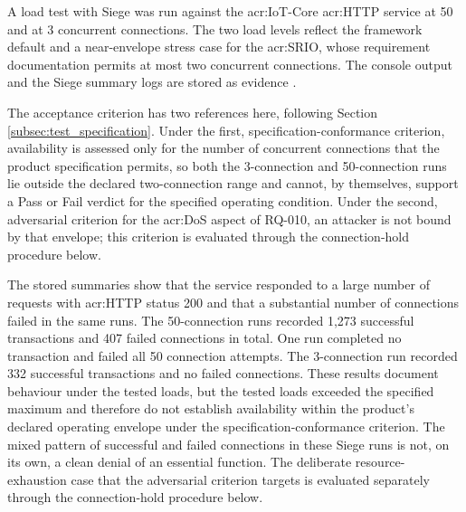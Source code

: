 A load test with Siege was run against the \gls{acr:IoT}-Core \gls{acr:HTTP} service at 50 and at 3 concurrent connections. The two load levels reflect the framework default and a near-envelope stress case for the \gls{acr:SRIO}, whose requirement documentation permits at most two concurrent connections. The console output and the Siege summary logs are stored as evidence \cite{joedog-siege}.

The acceptance criterion has two references here, following Section \ref{subsec:test_specification}. Under the first, specification-conformance criterion, availability is assessed only for the number of concurrent connections that the product specification permits, so both the 3-connection and 50-connection runs lie outside the declared two-connection range and cannot, by themselves, support a Pass or Fail verdict for the specified operating condition. Under the second, adversarial criterion for the \gls{acr:DoS} aspect of RQ-010, an attacker is not bound by that envelope; this criterion is evaluated through the connection-hold procedure below.

The stored summaries show that the service responded to a large number of requests with \gls{acr:HTTP} status 200 and that a substantial number of connections failed in the same runs. The 50-connection runs recorded 1,273 successful transactions and 407 failed connections in total. One run completed no transaction and failed all 50 connection attempts. The 3-connection run recorded 332 successful transactions and no failed connections. These results document behaviour under the tested loads, but the tested loads exceeded the specified maximum and therefore do not establish availability within the product's declared operating envelope under the specification-conformance criterion. The mixed pattern of successful and failed connections in these Siege runs is not, on its own, a clean denial of an essential function. The deliberate resource-exhaustion case that the adversarial criterion targets is evaluated separately through the connection-hold procedure below.


